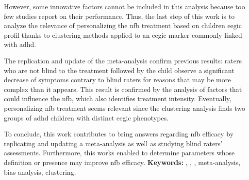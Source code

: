 However, some innovative factors cannot be included in this analysis because too few studies report on their performance.
Thus, the last step of this work is to analyze the relevance of personalizing the \gls{nfb} treatment based on children \gls{eegic} profil
thanks to clustering methods applied to an \gls{eegic} marker commonly linked with \gls{adhd}.

The replication and update of the meta-analysis confirm previous results: raters who are not blind to the treatment
followed by the child observe a significant decrease of symptoms contrary to blind raters for reasons that may be more complex 
than it appears. This result is confirmed by the analysis of factors that could influence the \gls{nfb}, which also identifies 
treatment intensity. Eventually, personalizing \gls{nfb} treatment seems relevant since the clustering analysis finds two groups
of \gls{adhd} children with distinct \gls{eegic} phenotypes. 

To conclude, this work contributes to bring answers regarding \gls{nfb} efficacy by replicating and updating a meta-analysis as well 
as studying blind raters' assessments. Furthermore, this works enabled to determine parameters whose definition or presence may improve
\gls{nfb} efficacy.
\vskip 0.3in
\noindent \large{\textbf{Keywords:}} , , , meta-analysis, bias analysis, clustering.